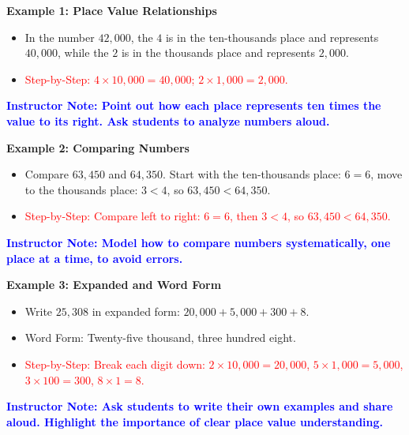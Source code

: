 \documentclass[12pt]{article}
\newcommand{\solution}[1]{\textcolor{red}{#1}}
\newcommand{\note}[1]{\textcolor{blue}{\textbf{Instructor Note: #1}}}
\begin{document}
\begin{tcolorbox}[colframe=black!60, colback=white, 
coltitle=black, colbacktitle=black!15, fonttitle=\bfseries\Large, 
title=Examples, halign title=center, left=10pt, right=10pt, top=10pt, bottom=15pt]
\textbf{Example 1: Place Value Relationships}
\begin{itemize}
    \item In the number \( 42,000 \), the \( 4 \) is in the ten-thousands place and represents \( 40,000 \), while the \( 2 \) is in the thousands place and represents \( 2,000 \).
    \item \solution{Step-by-Step: \( 4 \times 10,000 = 40,000 \); \( 2 \times 1,000 = 2,000 \).}
\end{itemize}

\note{Point out how each place represents ten times the value to its right. Ask students to analyze numbers aloud.}

\textbf{Example 2: Comparing Numbers}
\begin{itemize}
    \item Compare \( 63,450 \) and \( 64,350 \). Start with the ten-thousands place: \( 6 = 6 \), move to the thousands place: \( 3 < 4 \), so \( 63,450 < 64,350 \).
    \item \solution{Step-by-Step: Compare left to right: \( 6 = 6 \), then \( 3 < 4 \), so \( 63,450 < 64,350 \).}
\end{itemize}

\note{Model how to compare numbers systematically, one place at a time, to avoid errors.}

\textbf{Example 3: Expanded and Word Form}
\begin{itemize}
    \item Write \( 25,308 \) in expanded form: \( 20,000 + 5,000 + 300 + 8 \).
    \item Word Form: Twenty-five thousand, three hundred eight.
    \item \solution{Step-by-Step: Break each digit down: \( 2 \times 10,000 = 20,000 \), \( 5 \times 1,000 = 5,000 \), \( 3 \times 100 = 300 \), \( 8 \times 1 = 8 \).}
\end{itemize}

\note{Ask students to write their own examples and share aloud. Highlight the importance of clear place value understanding.}
\end{tcolorbox}
\end{document}
